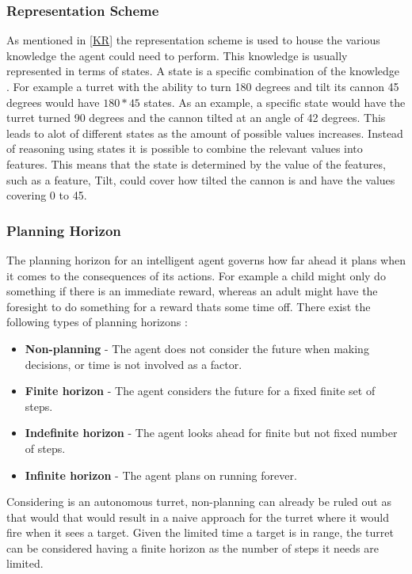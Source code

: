 \subsubsection{Representation Scheme}
As mentioned in \autoref{KR} the representation scheme is used to house the
various knowledge the agent could need to perform. This knowledge is usually
represented in terms of states. A state is a specific combination of
the knowledge \citep[ch1.5.2]{MIBook}. For example a turret with the ability
to turn 180 degrees and tilt its cannon 45 degrees would have $180 * 45$ states. As an example, a
specific state would have the turret turned 90 degrees and the cannon tilted at an angle of 42
degrees. This leads to alot of different states as the amount of possible values
increases. Instead of reasoning using states it is possible to combine the
relevant values into features. This means that the state is determined by the
value of the features, such as a feature, Tilt, could cover how tilted the
cannon is and have the values covering 0 to 45.

\subsubsection{Planning Horizon}
The planning horizon for an intelligent agent governs how far ahead it plans
when it comes to the consequences of its actions. For example a child might
only do something if there is an immediate reward, whereas an adult might have
the foresight to do something for a reward thats some time off. There exist the
following types of planning horizons \citep[ch1.5.3]{MIBook}:
\begin{itemize}
	\item \textbf{Non-planning} - The agent does not consider the future when
	making decisions, or time is not involved as a factor.
	\item \textbf{Finite horizon} - The agent considers the future for a fixed
	finite set of steps. 
	\item \textbf{Indefinite horizon} - The agent looks ahead for finite but not
	fixed number of steps.
	\item \textbf{Infinite horizon} - The agent plans on running forever.	
\end{itemize}

Considering \name is an autonomous turret, non-planning can already be ruled
out as that would that would result in a naive approach for the turret where it
would fire when it sees a target. Given the limited time a target is in range,
the turret can be considered having a finite horizon as the number of steps it
needs are limited.

